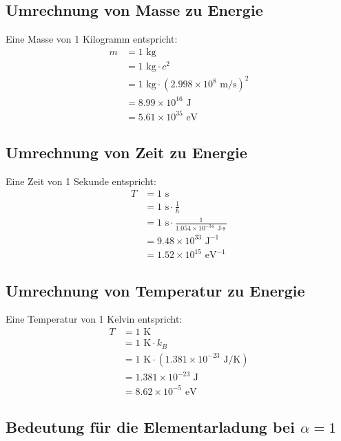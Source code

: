 \documentclass{article}
\begin{document}
	\subsection{Umrechnung von Masse zu Energie}
	
	Eine Masse von 1 Kilogramm entspricht:
	\begin{align}
		m &= 1 \text{ kg} \\
		&= 1 \text{ kg} \cdot c^2 \\
		&= 1 \text{ kg} \cdot (2.998 \times 10^8 \text{ m/s})^2 \\
		&= 8.99 \times 10^{16} \text{ J} \\
		&= 5.61 \times 10^{35} \text{ eV}
	\end{align}
	
	\subsection{Umrechnung von Zeit zu Energie}
	
	Eine Zeit von 1 Sekunde entspricht:
	\begin{align}
		T &= 1 \text{ s} \\
		&= 1 \text{ s} \cdot \frac{1}{\hbar} \\
		&= 1 \text{ s} \cdot \frac{1}{1.054 \times 10^{-34} \text{ J$\cdot$s}} \\
		&= 9.48 \times 10^{33} \text{ J}^{-1} \\
		&= 1.52 \times 10^{15} \text{ eV}^{-1}
	\end{align}
	
	\subsection{Umrechnung von Temperatur zu Energie}
	
	Eine Temperatur von 1 Kelvin entspricht:
	\begin{align}
		T &= 1 \text{ K} \\
		&= 1 \text{ K} \cdot k_B \\
		&= 1 \text{ K} \cdot (1.381 \times 10^{-23} \text{ J/K}) \\
		&= 1.381 \times 10^{-23} \text{ J} \\
		&= 8.62 \times 10^{-5} \text{ eV}
	\end{align}
	
	\subsection{Bedeutung für die Elementarladung bei $\alpha = 1$}
	
\end{document}
